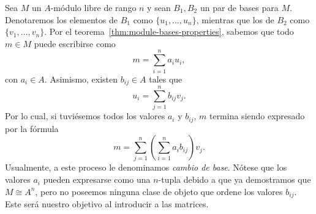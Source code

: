 \documentclass[11pt,oneside]{book}
\begin{document}
Sea $M$ un $A$-módulo libre de rango $n$ y sean $B_1,B_2$ un par de bases para $M$. Denotaremos los elementos de $B_1$ como $\{u_1,\dots,u_n\}$, mientras que los de $B_2$ como $\{v_1,\dots,v_n\}$. Por el teorema~\ref{thm:module-bases-properties}, sabemos que todo $m\in M$ puede escribirse como
$$m=\sum_{i=1}^n a_iu_i,$$
con $a_i\in A$. Asimismo, existen $b_{ij}\in A$ tales que
$$u_i=\sum_{j=1}^n b_{ij}v_j.$$
Por lo cual, si tuviésemos todos los valores $a_i$ y $b_{ij}$, $m$ termina siendo expresado por la fórmula
$$m=\sum_{j=1}^n\left(\sum_{i=1}^n a_ib_{ij}\right)v_j.$$
Usualmente, a este proceso le denominamos \textit{cambio de base}. Nótese que los valores $a_i$ pueden expresarse como una $n$-tupla debido a que ya demostramos que $M\cong A^n$, pero no poseemos ninguna clase de objeto que ordene los valores $b_{ij}$. Este será nuestro objetivo al introducir a las matrices.
\end{document}

